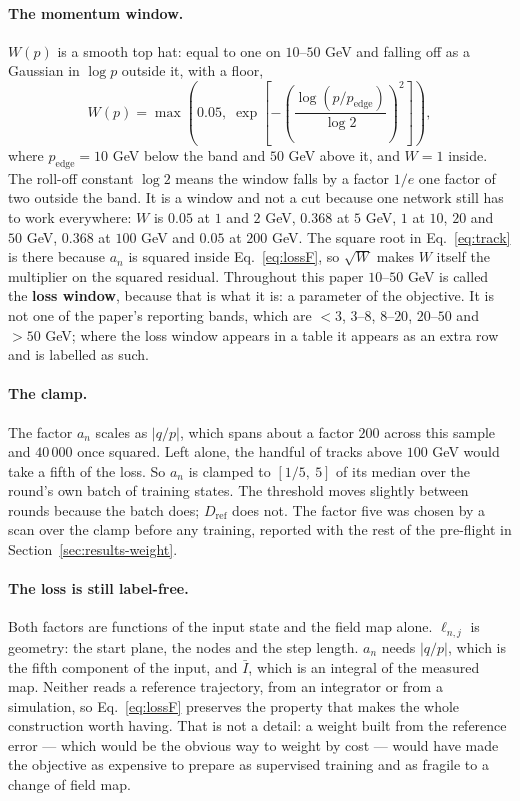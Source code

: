 \documentclass[11pt,a4paper]{article}
\begin{document}
\paragraph{The momentum window.} $W(p)$ is a smooth top hat: equal to one on
$10$--$50$ GeV and falling off as a Gaussian in $\log p$ outside it, with a
floor,
%
\begin{equation}
  W(p) = \max\!\left(0.05,\;
    \exp\!\left[-\left(\frac{\log(p/p_{\mathrm{edge}})}{\log 2}\right)^{\!2}
    \right]\right),
  \label{eq:window}
\end{equation}
%
where $p_{\mathrm{edge}} = 10$ GeV below the band and $50$ GeV above it, and
$W = 1$ inside. The roll-off constant $\log 2$ means the window falls by a
factor $1/e$ one factor of two outside the band. It is a window and not a cut
because one network still has to work everywhere: $W$ is $0.05$ at $1$ and
$2$ GeV, $0.368$ at $5$ GeV, $1$ at $10$, $20$ and $50$ GeV, $0.368$ at
$100$ GeV and $0.05$ at $200$ GeV. The square root in Eq.~\eqref{eq:track} is
there because $a_n$ is squared inside Eq.~\eqref{eq:lossF}, so $\sqrt{W}$ makes
$W$ itself the multiplier on the squared residual. Throughout this paper
$10$--$50$ GeV is called the \textbf{loss window}, because that is what it is:
a parameter of the objective. It is not one of the paper's reporting bands,
which are $<3$, $3$--$8$, $8$--$20$, $20$--$50$ and $>50$ GeV; where the loss
window appears in a table it appears as an extra row and is labelled as such.

\paragraph{The clamp.} The factor $a_n$ scales as $|q/p|$, which spans about a
factor $200$ across this sample and $40\,000$ once squared. Left alone, the
handful of tracks above $100$ GeV would take a fifth of the loss. So $a_n$ is
clamped to $[1/5,\ 5]$ of its median over the round's own batch of training
states. The threshold moves slightly between rounds because the batch does;
$D_{\mathrm{ref}}$ does not. The factor five was chosen by a scan over the
clamp before any training, reported with the rest of the pre-flight in
Section~\ref{sec:results-weight}.

\paragraph{The loss is still label-free.} Both factors are functions of the
input state and the field map alone. $\ell_{n,j}$ is geometry: the start plane,
the nodes and the step length. $a_n$ needs $|q/p|$, which is the fifth
component of the input, and $\bar{I}$, which is an integral of the measured
map. Neither reads a reference trajectory, from an integrator or from a
simulation, so Eq.~\eqref{eq:lossF} preserves the property that makes the whole
construction worth having. That is not a detail: a weight built from the
reference error --- which would be the obvious way to weight by cost --- would
have made the objective as expensive to prepare as supervised training and as
fragile to a change of field map.
\end{document}
